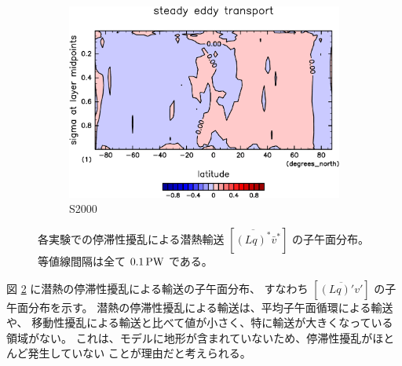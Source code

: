 \documentclass[body]{subfiles}
\begin{document}
\begin{figure}[t]
\begin{subfigure}{.4\textwidth}
		\includegraphics[width=\columnwidth]{S2000/MeriHeatTransTest@latentEn_SE,time=7300:7665-crop-rotate.pdf}
		\caption{S2000}\label{潜熱停滞性擾乱S2000}
	\end{subfigure}
	\caption[各実験でのに停滞性擾乱による潜熱輸送の子午面分布]{
		各実験での停滞性擾乱による潜熱輸送 \([\overline{(Lq)^*}\bar v^*]\) の子午面分布。
		等値線間隔は全て \(0.1\hmu{PW}\) である。
	}\label{潜熱停滞性擾乱}
\end{figure}

図 \ref{潜熱停滞性擾乱} に潜熱の停滞性擾乱による輸送の子午面分布、
すなわち \([\overline{(Lq)'v'}]\) の子午面分布を示す。
潜熱の停滞性擾乱による輸送は、平均子午面循環による輸送や、
移動性擾乱による輸送と比べて値が小さく、特に輸送が大きくなっている領域がない。
これは、モデルに地形が含まれていないため、停滞性擾乱がほとんど発生していない
ことが理由だと考えられる。
\end{document}
